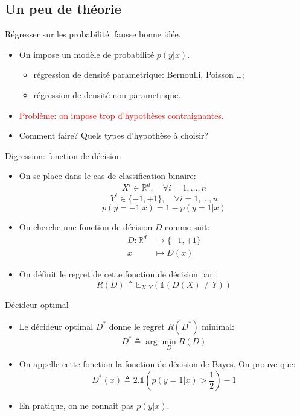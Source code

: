 \documentclass[8pt]{beamer}
\begin{document}
	\subsection{Un peu de théorie}
		\begin{frame}{Régresser sur les probabilité: fausse bonne idée.}
			\begin{itemize}
				\item<1-> On impose un modèle de probabilité $p(y\vert x)$.
					\begin{itemize}
						\item régression de densité parametrique: Bernoulli, Poisson \dots;
						\item régression de densité non-parametrique.
					\end{itemize}
				\item<2-> \textcolor{red}{Problème: on impose trop d'hypothèses contraignantes.}
				\item<3-> Comment faire? Quels types d'hypothèse à choisir?
			\end{itemize}
		\end{frame}
		\begin{frame}{Digression: fonction de décision}
			\begin{itemize}
				\item<1-> On se place dans le cas de classification binaire:
					$$ X^i \in \mathbb{R}^d , \quad \forall i=1,\dots,n$$
					$$ Y^i \in \{-1, +1\} , \quad \forall i=1,\dots,n$$
					$$p(y = -1 \vert x) = 1 - p(y = 1 \vert x)$$
				\item<2-> On cherche une fonction de décision $D$ comme suit:
				\begin{align*}
					D: \mathbb{R}^d &\rightarrow \{-1, +1\} \\
					x &\mapsto D(x)
				\end{align*}
				\item<3-> On définit le regret de cette fonction de décision par:
				\begin{equation}
					R(D) \triangleq \mathbb{E}_{X,Y}(\mathbb{1}(D(X)\neq Y))
				\end{equation}
			\end{itemize}
		\end{frame}
		\begin{frame}{Décideur optimal}
			\begin{itemize}
				\item<1-> Le décideur optimal $D^*$ donne le regret $R(D^*)$ minimal:
					  \begin{equation}
						  D^* \triangleq \arg \min_{D} R(D) 
					  \end{equation}
				\item<2-> On appelle cette fonction la fonction de décision de Bayes. On prouve que:
					  \begin{equation}
						D^*(x) \triangleq 2.\mathbb{1}(p(y = 1 \vert x)> \frac{1}{2}) - 1
					  \end{equation}
				\item<3-> En pratique, on ne connait pas $p(y\vert x)$.
			\end{itemize}
		\end{frame}
\end{document}
